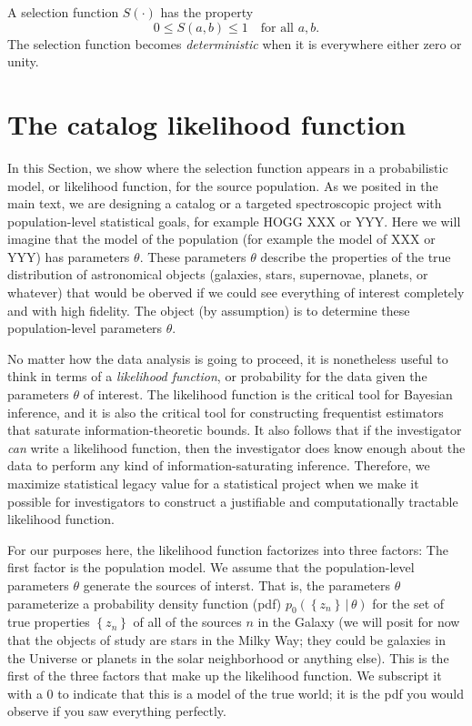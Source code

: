 \documentclass[modern]{aastex62}
\newcommand{\given}{\,|\,}
\newcommand{\set}[1]{\left\{{#1}\right\}}
\newcommand{\sectionname}{Section}
\begin{document}
A selection function $S(\cdot)$ has the property
\begin{equation}
0\leq S(a, b)\leq 1 \quad \mbox{for all $a, b$.}
\end{equation}
The selection function becomes \emph{deterministic} when it is
everywhere either zero or unity.

\section{The catalog likelihood function}\label{app:lf}

In this \sectionname, we show where the selection function appears in
a probabilistic model, or likelihood function, for the source
population.
As we posited in the main text, we are designing a catalog or a targeted
spectroscopic project
with population-level statistical goals, for example HOGG XXX or YYY.
Here we will imagine that the model of the population (for example the model
of XXX or YYY) has parameters $\theta$.
These parameters $\theta$ describe the properties of the true distribution
of astronomical objects (galaxies, stars, supernovae, planets, or whatever)
that would be oberved if we could see everything of interest completely and
with high fidelity.
The object (by assumption) is to determine these population-level parameters
$\theta$.

No matter how the data analysis is going to proceed, it is nonetheless
useful to think in
terms of a \emph{likelihood function}, or probability for the data given
the parameters $\theta$ of interest.
The likelihood function is the critical tool for Bayesian inference, and
it is also the critical tool for constructing frequentist estimators that
saturate information-theoretic bounds.
It also follows that if the investigator \emph{can} write a likelihood
function, then the investigator does know enough about the data to perform
any kind of information-saturating inference.
Therefore, we maximize statistical legacy value for a statistical project
when we make it possible for investigators to construct a justifiable and
computationally tractable likelihood function.

For our purposes here, the likelihood function factorizes into three
factors:
The first factor is the population model.
We assume that the population-level parameters $\theta$ generate the
sources of interst.
That is, the parameters $\theta$ parameterize a probability density
function (pdf) $p_0(\set{z_n}\given\theta)$
for the set of true properties $\set{z_n}$ of all of the sources $n$
in the Galaxy (we will posit for now that the objects of study are
stars in the Milky Way; they could be galaxies in the Universe or
planets in the solar neighborhood or anything else).
This is the first of the three factors that make up the likelihood
function.
We subscript it with a $0$ to indicate that
this is a model of the true world;
it is the pdf you would observe if you saw everything perfectly.
\end{document}
